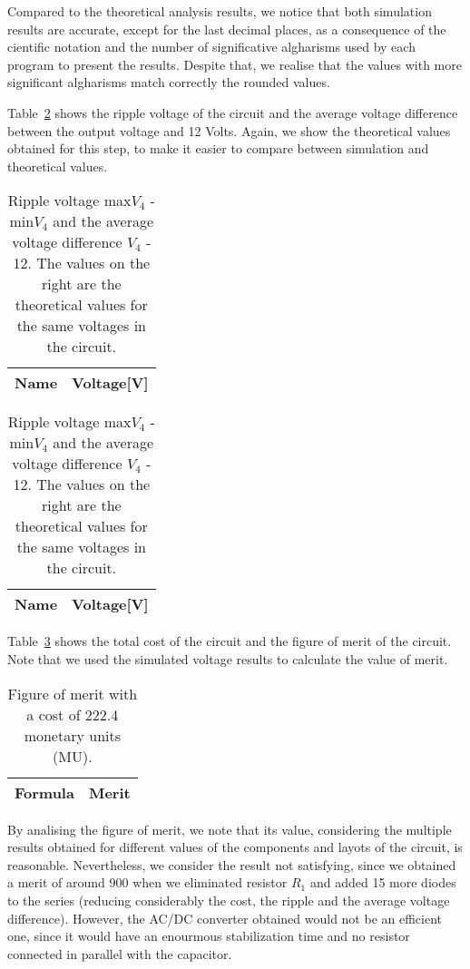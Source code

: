 	Compared to the theoretical analysis results, we notice that both simulation results are accurate, except for the last 
decimal places, as a consequence of the cientific notation and the number of significative algharisms used by each program to 
present the results. Despite that, we realise that the values with more significant algharisms match correctly the rounded values.


Table~\ref{tab2:op} shows the ripple voltage of the circuit and the average voltage difference
between the output voltage and 12 Volts. Again, we show the theoretical values obtained for this step, 
to make it easier to compare between simulation and theoretical values.


\begin{table}[H]
  \centering
  \begin{tabular}{|l|r|}
    \hline    
    {\bf Name} & {\bf Voltage[V]} \\ \hline
    
  \end{tabular}
  \begin{tabular}{|l|r|}
    \hline    
    {\bf Name} & {\bf Voltage[V]} \\ \hline
    
  \end{tabular}
  \caption{Ripple voltage max$V_4$ - min$V_4$ and the average voltage difference $V_4$ - 12. The values on the right are the theoretical 
  values for the same voltages in the circuit.}
  \label{tab2:op}
\end{table}


Table~\ref{tab3:op} shows the total cost of the circuit and the figure of merit of the circuit. 
Note that we used the simulated voltage results to calculate the value of merit.


\begin{table}[H]
  \centering
  \begin{tabular}{|l|r|}
    \hline    
    {\bf Formula} & {\bf Merit} \\ \hline
    
  \end{tabular}
  \caption{Figure of merit with a cost of 222.4 monetary units (MU).}
  \label{tab3:op}
\end{table}

By analising the figure of merit, we note that its value, considering the multiple results obtained for different values of the components and layots of the circuit, is
reasonable. Nevertheless, we consider the result not satisfying, since we obtained a merit of around 900 when we eliminated resistor $R_1$ and added 15 more diodes to the series
(reducing considerably the cost, the ripple and the average voltage difference). However, the AC/DC converter obtained would not be an efficient one, since it would have an enourmous
stabilization time and no resistor connected in parallel with the capacitor.

